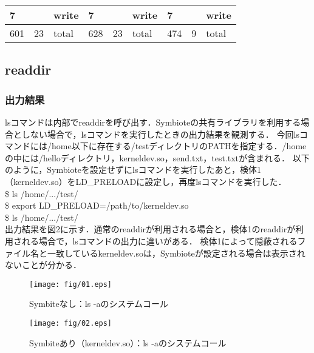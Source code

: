 \documentclass[submit,techreq,noauthor]{eco}	%
\begin{document}
\begin{table*}[t]
\begin{tabular}{|lllllllll|}
  \multicolumn{1}{|l|}{7}     & \multicolumn{1}{l|}{}       & \multicolumn{1}{l|}{write}             & \multicolumn{1}{l|}{7}     & \multicolumn{1}{l|}{}       & \multicolumn{1}{l|}{write}             & \multicolumn{1}{l|}{7}     & \multicolumn{1}{l|}{}       & write             \\ \hline
  \multicolumn{1}{|l|}{601}   & \multicolumn{1}{l|}{23}     & \multicolumn{1}{l|}{total}             & \multicolumn{1}{l|}{628}   & \multicolumn{1}{l|}{23}     & \multicolumn{1}{l|}{total}             & \multicolumn{1}{l|}{474}   & \multicolumn{1}{l|}{9}      & total             \\ \hline
  \end{tabular}
  \end{table*}

\subsection{readdir}
\subsubsection{出力結果}
lsコマンドは内部でreaddirを呼び出す．Symbioteの共有ライブラリを利用する場合としない場合で，lsコマンドを実行したときの出力結果を観測する．
今回lsコマンドには/home以下に存在する/testディレクトリのPATHを指定する．/homeの中には/helloディレクトリ，kerneldev.so，send.txt，test.txtが含まれる．
以下のように，Symbioteを設定せずにlsコマンドを実行したあと，検体1（kerneldev.so）をLD\_PRELOADに設定し，再度lsコマンドを実行した．\\
\$ ls /home/.../test/\\
\$ export LD\_PRELOAD=/path/to/kerneldev.so\\
\$ ls /home/.../test/\\
出力結果を図2に示す．通常のreaddirが利用される場合と，検体1のreaddirが利用される場合で，lsコマンドの出力に違いがある．
検体1によって隠蔽されるファイル名と一致しているkerneldev.soは，Symbioteが設定される場合は表示されないことが分かる．\\

\begin{figure*}[t]
	\centering
  \texttt{[image: fig/01.eps]}
	\caption{Symbiteなし：ls -aのシステムコール}
	\label{fig:s-ls}
\end{figure*}

\begin{figure*}[t]
	\centering
  \texttt{[image: fig/02.eps]}
	\caption{Symbiteあり（kerneldev.so）：ls -aのシステムコール}
	\label{fig:s-ls}
\end{figure*}
\end{document}
